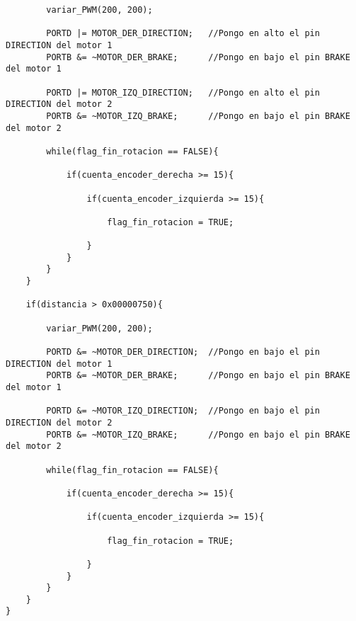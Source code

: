 \documentclass[a4paper,12pt]{article}   %
\begin{document}
\begin{lstlisting}
        variar_PWM(200, 200);

        PORTD |= MOTOR_DER_DIRECTION; 	//Pongo en alto el pin DIRECTION del motor 1
        PORTB &= ~MOTOR_DER_BRAKE;	    //Pongo en bajo el pin BRAKE del motor 1

        PORTD |= MOTOR_IZQ_DIRECTION; 	//Pongo en alto el pin DIRECTION del motor 2
        PORTB &= ~MOTOR_IZQ_BRAKE;	    //Pongo en bajo el pin BRAKE del motor 2

        while(flag_fin_rotacion == FALSE){

            if(cuenta_encoder_derecha >= 15){

                if(cuenta_encoder_izquierda >= 15){

                    flag_fin_rotacion = TRUE;

                }
            }
        }
    }

    if(distancia > 0x00000750){

        variar_PWM(200, 200);

        PORTD &= ~MOTOR_DER_DIRECTION; 	//Pongo en bajo el pin DIRECTION del motor 1
        PORTB &= ~MOTOR_DER_BRAKE;	    //Pongo en bajo el pin BRAKE del motor 1

        PORTD &= ~MOTOR_IZQ_DIRECTION; 	//Pongo en bajo el pin DIRECTION del motor 2
        PORTB &= ~MOTOR_IZQ_BRAKE;	    //Pongo en bajo el pin BRAKE del motor 2

        while(flag_fin_rotacion == FALSE){

            if(cuenta_encoder_derecha >= 15){

                if(cuenta_encoder_izquierda >= 15){

                    flag_fin_rotacion = TRUE;

                }
            }
        }
    }
}


\end{lstlisting}
\end{document}
